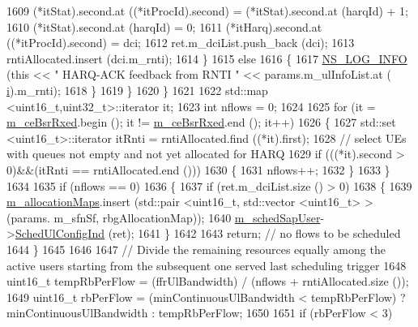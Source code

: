 \begin{DoxyCode}
1609               (*itStat).second.at ((*itProcId).second) = (*itStat).second.at (harqId) + 1;
1610               (*itStat).second.at (harqId) = 0;
1611               (*itHarq).second.at ((*itProcId).second) = dci;
1612               ret.m\_dciList.push\_back (dci);
1613               rntiAllocated.insert (dci.m\_rnti);
1614             \}
1615           \textcolor{keywordflow}{else}
1616             \{
1617               \hyperlink{group__logging_gafbd73ee2cf9f26b319f49086d8e860fb}{NS\_LOG\_INFO} (\textcolor{keyword}{this} << \textcolor{stringliteral}{" HARQ-ACK feedback from RNTI "} << params.m\_ulInfoList.at (
      \hyperlink{bernuolliDistribution_8m_a6f6ccfcf58b31cb6412107d9d5281426}{i}).m\_rnti);
1618             \}
1619         \}
1620     \}
1621 
1622   std::map <uint16\_t,uint32\_t>::iterator it;
1623   \textcolor{keywordtype}{int} nflows = 0;
1624 
1625   \textcolor{keywordflow}{for} (it = \hyperlink{classns3_1_1PfFfMacScheduler_a9d4cd2380a8e04f1e7d69ac67628b9cc}{m\_ceBsrRxed}.begin (); it != \hyperlink{classns3_1_1PfFfMacScheduler_a9d4cd2380a8e04f1e7d69ac67628b9cc}{m\_ceBsrRxed}.end (); it++)
1626     \{
1627       std::set <uint16\_t>::iterator itRnti = rntiAllocated.find ((*it).first);
1628       \textcolor{comment}{// select UEs with queues not empty and not yet allocated for HARQ}
1629       \textcolor{keywordflow}{if} (((*it).second > 0)&&(itRnti == rntiAllocated.end ()))
1630         \{
1631           nflows++;
1632         \}
1633     \}
1634 
1635   \textcolor{keywordflow}{if} (nflows == 0)
1636     \{
1637       \textcolor{keywordflow}{if} (ret.m\_dciList.size () > 0)
1638         \{
1639           \hyperlink{classns3_1_1PfFfMacScheduler_a372b18540784762ebc10292caf8ca40f}{m\_allocationMaps}.insert (std::pair <uint16\_t, std::vector <uint16\_t> > (params.
      m\_sfnSf, rbgAllocationMap));
1640           \hyperlink{classns3_1_1PfFfMacScheduler_a16d9c49b69668f9343e9e7409179b8ae}{m\_schedSapUser}->\hyperlink{classns3_1_1FfMacSchedSapUser_a1b89636256701a84d990db7db8aea874}{SchedUlConfigInd} (ret);
1641         \}
1642 
1643       \textcolor{keywordflow}{return};  \textcolor{comment}{// no flows to be scheduled}
1644     \}
1645 
1646 
1647   \textcolor{comment}{// Divide the remaining resources equally among the active users starting from the subsequent one served
       last scheduling trigger}
1648   uint16\_t tempRbPerFlow = (ffrUlBandwidth) / (nflows + rntiAllocated.size ());
1649   uint16\_t rbPerFlow = (minContinuousUlBandwidth < tempRbPerFlow) ? minContinuousUlBandwidth : 
      tempRbPerFlow;
1650 
1651   \textcolor{keywordflow}{if} (rbPerFlow < 3)

\end{DoxyCode}
